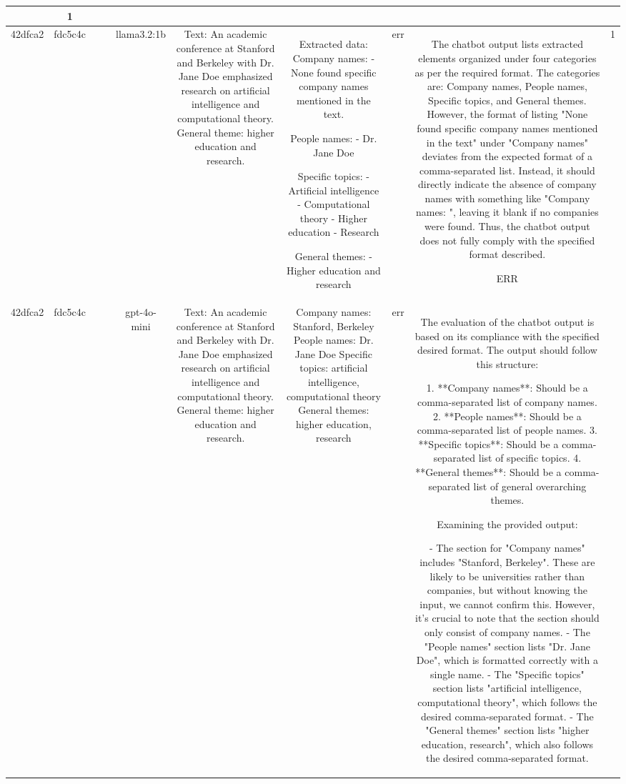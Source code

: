 \begin{table}[h!]
\begin{tabular}{|c|c|c|c|c|c|c|c|c|c|}
{Therefore, the provided output complies with the format and structure guidelines of the chatbot description.

OK & 1\\
\hline
42dfca2 & fdc5c4c &  &  & llama3.2:1b & Text: An academic conference at Stanford and Berkeley with Dr. Jane Doe emphasized research on artificial intelligence and computational theory. General theme: higher education and research. & Extracted data:
Company names: 
- None found specific company names mentioned in the text.

People names: 
- Dr. Jane Doe
 
Specific topics: 
- Artificial intelligence
- Computational theory
- Higher education
- Research

General themes: 
- Higher education and research & err & The chatbot output lists extracted elements organized under four categories as per the required format. The categories are: Company names, People names, Specific topics, and General themes. However, the format of listing "None found specific company names mentioned in the text" under "Company names" deviates from the expected format of a comma-separated list. Instead, it should directly indicate the absence of company names with something like "Company names: ", leaving it blank if no companies were found. Thus, the chatbot output does not fully comply with the specified format described.

ERR & 1\\
\hline
42dfca2 & fdc5c4c &  &  & gpt-4o-mini & Text: An academic conference at Stanford and Berkeley with Dr. Jane Doe emphasized research on artificial intelligence and computational theory. General theme: higher education and research. & Company names: Stanford, Berkeley  
People names: Dr. Jane Doe  
Specific topics: artificial intelligence, computational theory  
General themes: higher education, research   & err & The evaluation of the chatbot output is based on its compliance with the specified desired format. The output should follow this structure:

1. **Company names**: Should be a comma-separated list of company names.
2. **People names**: Should be a comma-separated list of people names.
3. **Specific topics**: Should be a comma-separated list of specific topics.
4. **General themes**: Should be a comma-separated list of general overarching themes.

Examining the provided output:

- The section for "Company names" includes "Stanford, Berkeley". These are likely to be universities rather than companies, but without knowing the input, we cannot confirm this. However, it's crucial to note that the section should only consist of company names.
- The "People names" section lists "Dr. Jane Doe", which is formatted correctly with a single name.
- The "Specific topics" section lists "artificial intelligence, computational theory", which follows the desired comma-separated format.
- The "General themes" section lists "higher education, research", which also follows the desired comma-separated format.

}
\end{tabular}
\end{table}
